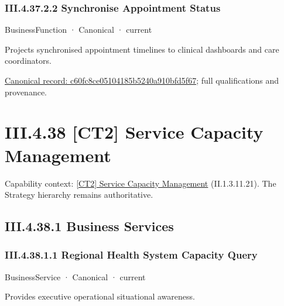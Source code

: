 \subsubsection*{III.4.37.2.2 Synchronise Appointment Status}
\label{navigation:III.4.37.2.2}

\label{element:c60fc8ce05104185b5240a910bfd5f67}
{\small BusinessFunction · Canonical · current}\par

Projects synchronised appointment timelines to clinical dashboards and care coordinators.


{\footnotesize \href{../../../../continuum/business/business-function/c60fc8ce05104185b5240a910bfd5f67.md}{Canonical record: c60fc8ce05104185b5240a910bfd5f67}; full qualifications and provenance.}\par
\section*{III.4.38 [CT2] Service Capacity Management}
\label{navigation:III.4.38}

{\small Capability context: \hyperref[element:d86105bf9c86445394088f65c895d37f]{[CT2] Service Capacity Management} (II.1.3.11.21). The Strategy hierarchy remains authoritative.}\par
\subsection*{III.4.38.1 Business Services}
\label{navigation:III.4.38.1}

\subsubsection*{III.4.38.1.1 Regional Health System Capacity Query}
\label{navigation:III.4.38.1.1}

\label{element:ecbb1944572d44dbba55aaf565559d13}
{\small BusinessService · Canonical · current}\par

Provides executive operational situational awareness.


